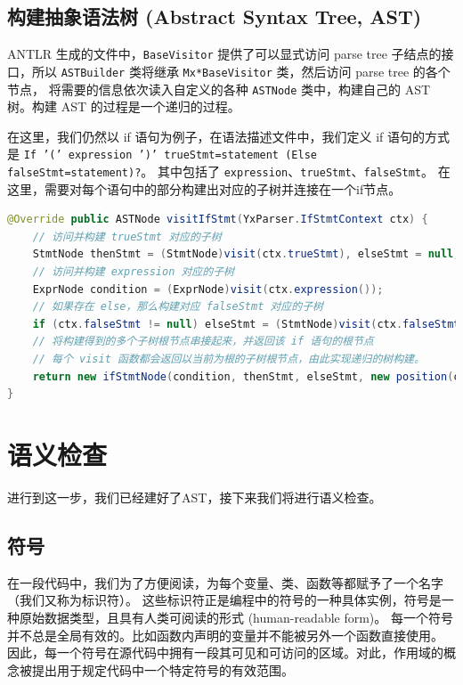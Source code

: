 \subsection{构建抽象语法树 (Abstract Syntax Tree, AST)}
ANTLR 生成的文件中，\texttt{BaseVisitor} 提供了可以显式访问 parse tree 子结点的接口，所以
\texttt{ASTBuilder} 类将继承 \texttt{Mx*BaseVisitor} 类，然后访问 parse tree 的各个节点，
将需要的信息依次读入自定义的各种 \texttt{ASTNode} 类中，构建自己的 AST 树。构建 AST 的过程是一个递归的过程。

在这里，我们仍然以 if 语句为例子，在语法描述文件中，我们定义 if 语句的方式是 \texttt{If '(' expression ')' trueStmt=statement (Else falseStmt=statement)?}。
其中包括了 \texttt{expression}、\texttt{trueStmt}、\texttt{falseStmt}。
在这里，需要对每个语句中的部分构建出对应的子树并连接在一个if节点。
\begin{lstlisting}[language=Java]
@Override public ASTNode visitIfStmt(YxParser.IfStmtContext ctx) {
    // 访问并构建 trueStmt 对应的子树
    StmtNode thenStmt = (StmtNode)visit(ctx.trueStmt), elseStmt = null;
    // 访问并构建 expression 对应的子树
    ExprNode condition = (ExprNode)visit(ctx.expression());
    // 如果存在 else，那么构建对应 falseStmt 对应的子树
    if (ctx.falseStmt != null) elseStmt = (StmtNode)visit(ctx.falseStmt);
    // 将构建得到的多个子树根节点串接起来，并返回该 if 语句的根节点
    // 每个 visit 函数都会返回以当前为根的子树根节点，由此实现递归的树构建。
    return new ifStmtNode(condition, thenStmt, elseStmt, new position(ctx));
}
\end{lstlisting}


\section{语义检查}
进行到这一步，我们已经建好了AST，接下来我们将进行语义检查。

\subsection{符号}
在一段代码中，我们为了方便阅读，为每个变量、类、函数等都赋予了一个名字（我们又称为标识符）。
这些标识符正是编程中的符号的一种具体实例，符号是一种原始数据类型，且具有人类可阅读的形式 (human-readable form)。
每一个符号并不总是全局有效的。比如函数内声明的变量并不能被另外一个函数直接使用。
因此，每一个符号在源代码中拥有一段其可见和可访问的区域。对此，作用域的概念被提出用于规定代码中一个特定符号的有效范围。


